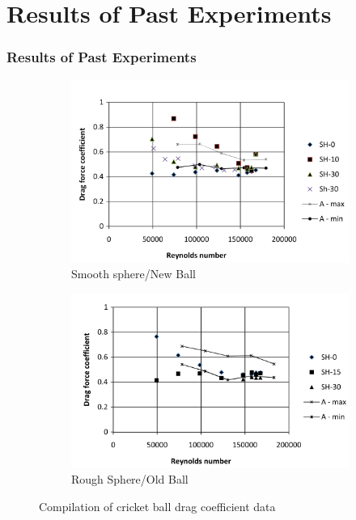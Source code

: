 \documentclass{beamer}
\begin{document}
\section{Results of Past Experiments}
\begin{frame}
\frametitle{Results of Past Experiments}

\begin{figure}[h!]
  \centering
  \begin{subfigure}[b]{0.4\linewidth}
    \includegraphics[width=\linewidth]{./figs/my_2.png}
    \caption{Smooth sphere/New Ball}
  \end{subfigure}
  \begin{subfigure}[b]{0.4\linewidth}
    \includegraphics[width=\linewidth]{./figs/my_3.png}
    \caption{Rough Sphere/Old Ball}
  \end{subfigure}
  \caption{Compilation of cricket ball drag coefficient data}
  \label{fig:drag1}
\end{figure}
\end{frame}
\end{document}
